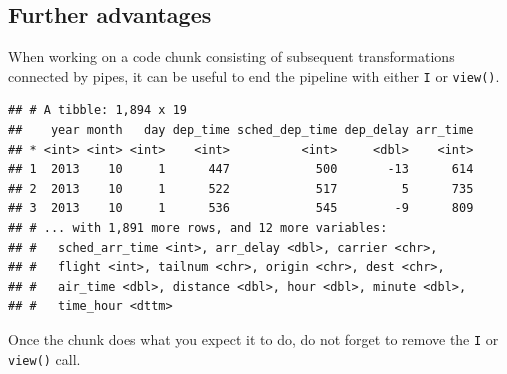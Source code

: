 \documentclass[]{book}
\newenvironment{Shaded}{}{}
\newcommand{\DecValTok}[1]{#1}
\newcommand{\KeywordTok}[1]{\textcolor[rgb]{0.00,0.00,1.00}{#1}}
\newcommand{\NormalTok}[1]{#1}
\newcommand{\OperatorTok}[1]{#1}
\newcommand{\StringTok}[1]{\textcolor[rgb]{0.00,0.50,0.50}{#1}}
\begin{document}
\hypertarget{further-advantages}{%
\subsection{Further advantages}\label{further-advantages}}

When working on a code chunk consisting of subsequent transformations connected by pipes, it can be useful to end the pipeline with either \texttt{I} or \texttt{view()}.

\begin{Shaded}
\end{Shaded}

\begin{verbatim}
## # A tibble: 1,894 x 19
##    year month   day dep_time sched_dep_time dep_delay arr_time
## * <int> <int> <int>    <int>          <int>     <dbl>    <int>
## 1  2013    10     1      447            500       -13      614
## 2  2013    10     1      522            517         5      735
## 3  2013    10     1      536            545        -9      809
## # ... with 1,891 more rows, and 12 more variables:
## #   sched_arr_time <int>, arr_delay <dbl>, carrier <chr>,
## #   flight <int>, tailnum <chr>, origin <chr>, dest <chr>,
## #   air_time <dbl>, distance <dbl>, hour <dbl>, minute <dbl>,
## #   time_hour <dttm>
\end{verbatim}

\begin{Shaded}
\end{Shaded}

Once the chunk does what you expect it to do, do not forget to remove the \texttt{I} or \texttt{view()} call.

\begin{Shaded}
\end{Shaded}
\end{document}
